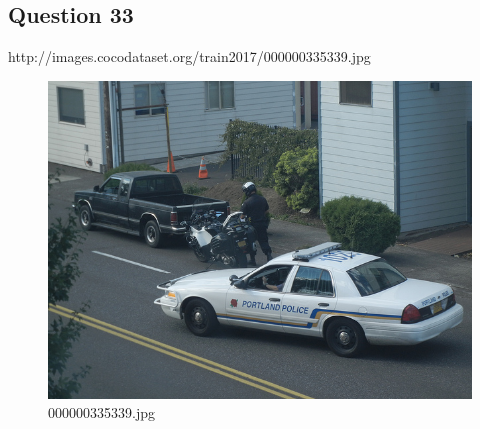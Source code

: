 \subsection*{Question 33}
http://images.cocodataset.org/train2017/000000335339.jpg
    \begin{figure}[h]
        \centering
        \includegraphics[width=0.8\linewidth]{../image set/easy/000000335339.jpg}
        \caption{000000335339.jpg}
    \end{figure} 
